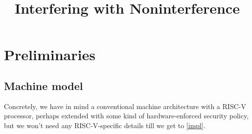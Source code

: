 \documentclass[conference]{IEEEtran}
\newif\ifdraft \drafttrue
\newif\iftext \textfalse
\newcommand{\bcp}[1]{\ifdraft\textcolor{violet}{{[BCP:~#1]}}\fi}
\begin{document}
\title{Interfering with Noninterference
\iftext\thanks{\bcp{Identify applicable funding agencies here (DARPA and NSF
    and...?)}}\fi
}

\iftext
\IEEEauthorblockN{Leonidas Lampropoulos}
\IEEEauthorblockA{\textit{University of Maryland \bcp{right?}}
  }
\and
\author{\IEEEauthorblockN{Roberto Blanco}
\IEEEauthorblockA{\textit{\bcp{affiliation?}}
}
\and
\IEEEauthorblockN{Benjamin C. Pierce}
\IEEEauthorblockA{\textit{University of Pennsylvania}
  }
\and
\IEEEauthorblockN{Andrew Tolmach}
\IEEEauthorblockA{\textit{Portland State University}
}
}
\fi

\maketitle

\iftext
\begin{abstract}
\end{abstract}

\begin{IEEEkeywords}
\end{IEEEkeywords}
\fi

\section{Preliminaries}

\subsection{Machine model}

Concretely, we have in mind a conventional machine architecture with a
RISC-V processor, perhaps extended with some kind of hardware-enforced
security policy, but we won't need any RISC-V-specific details till we get
to \cref{impl}.
\end{document}
